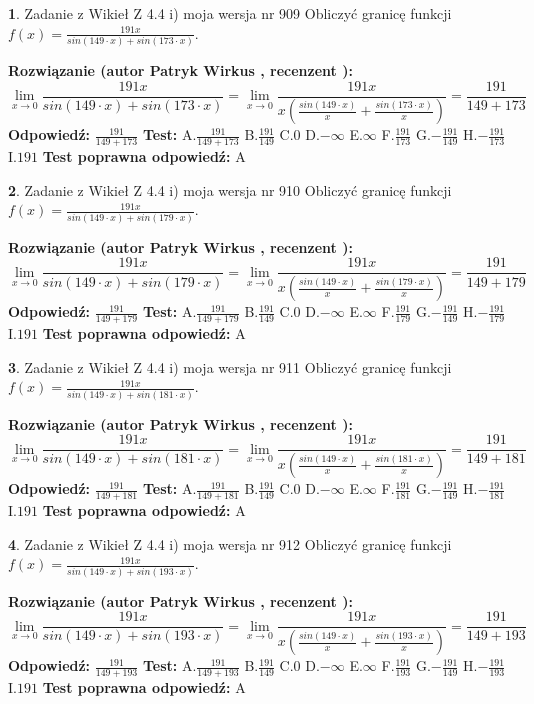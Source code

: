 \documentclass[12pt, a4paper]{article}
\theoremstyle{definition} %
\newtheorem{zad}{}
\newcommand{\zadStart}[1]{\begin{zad}#1\newline}
\newcommand{\zadStop}{\end{zad}}
\newcommand{\rozwStart}[2]{\noindent \textbf{Rozwiązanie (autor #1 , recenzent #2): }\newline}
\newcommand{\rozwStop}{\newline}
\newcommand{\odpStart}{\noindent \textbf{Odpowiedź:}\newline}
\newcommand{\odpStop}{\newline}
\newcommand{\testStart}{\noindent \textbf{Test:}\newline}
\newcommand{\testStop}{\newline}
\newcommand{\kluczStart}{\noindent \textbf{Test poprawna odpowiedź:}\newline}
\newcommand{\kluczStop}{\newline}
\begin{document}
\zadStart{Zadanie z Wikieł Z 4.4 i) moja wersja nr 909}
Obliczyć granicę funkcji $f(x)=\frac{191x}{sin(149\cdot x) +sin(173\cdot x)}$.
\zadStop
\rozwStart{Patryk Wirkus}{}
$$\lim\limits_{x\to 0}\frac{191x}{sin(149\cdot x) +sin(173\cdot x)}=\lim\limits_{x\to 0}\frac{191x}{x(\frac{sin(149\cdot x)}{x}+\frac{sin(173\cdot x)}{x})}=\frac{191}{149+173}$$
\rozwStop
\odpStart
$\frac{191}{149+173}$
\odpStop
\testStart
A.$\frac{191}{149+173}$
B.$\frac{191}{149}$
C.$0$
D.$-\infty$
E.$\infty$
F.$\frac{191}{173}$
G.$-\frac{191}{149}$
H.$-\frac{191}{173}$
I.$191$
\testStop
\kluczStart
A
\kluczStop



\zadStart{Zadanie z Wikieł Z 4.4 i) moja wersja nr 910}
Obliczyć granicę funkcji $f(x)=\frac{191x}{sin(149\cdot x) +sin(179\cdot x)}$.
\zadStop
\rozwStart{Patryk Wirkus}{}
$$\lim\limits_{x\to 0}\frac{191x}{sin(149\cdot x) +sin(179\cdot x)}=\lim\limits_{x\to 0}\frac{191x}{x(\frac{sin(149\cdot x)}{x}+\frac{sin(179\cdot x)}{x})}=\frac{191}{149+179}$$
\rozwStop
\odpStart
$\frac{191}{149+179}$
\odpStop
\testStart
A.$\frac{191}{149+179}$
B.$\frac{191}{149}$
C.$0$
D.$-\infty$
E.$\infty$
F.$\frac{191}{179}$
G.$-\frac{191}{149}$
H.$-\frac{191}{179}$
I.$191$
\testStop
\kluczStart
A
\kluczStop



\zadStart{Zadanie z Wikieł Z 4.4 i) moja wersja nr 911}
Obliczyć granicę funkcji $f(x)=\frac{191x}{sin(149\cdot x) +sin(181\cdot x)}$.
\zadStop
\rozwStart{Patryk Wirkus}{}
$$\lim\limits_{x\to 0}\frac{191x}{sin(149\cdot x) +sin(181\cdot x)}=\lim\limits_{x\to 0}\frac{191x}{x(\frac{sin(149\cdot x)}{x}+\frac{sin(181\cdot x)}{x})}=\frac{191}{149+181}$$
\rozwStop
\odpStart
$\frac{191}{149+181}$
\odpStop
\testStart
A.$\frac{191}{149+181}$
B.$\frac{191}{149}$
C.$0$
D.$-\infty$
E.$\infty$
F.$\frac{191}{181}$
G.$-\frac{191}{149}$
H.$-\frac{191}{181}$
I.$191$
\testStop
\kluczStart
A
\kluczStop



\zadStart{Zadanie z Wikieł Z 4.4 i) moja wersja nr 912}
Obliczyć granicę funkcji $f(x)=\frac{191x}{sin(149\cdot x) +sin(193\cdot x)}$.
\zadStop
\rozwStart{Patryk Wirkus}{}
$$\lim\limits_{x\to 0}\frac{191x}{sin(149\cdot x) +sin(193\cdot x)}=\lim\limits_{x\to 0}\frac{191x}{x(\frac{sin(149\cdot x)}{x}+\frac{sin(193\cdot x)}{x})}=\frac{191}{149+193}$$
\rozwStop
\odpStart
$\frac{191}{149+193}$
\odpStop
\testStart
A.$\frac{191}{149+193}$
B.$\frac{191}{149}$
C.$0$
D.$-\infty$
E.$\infty$
F.$\frac{191}{193}$
G.$-\frac{191}{149}$
H.$-\frac{191}{193}$
I.$191$
\testStop
\kluczStart
A
\kluczStop
\end{document}

